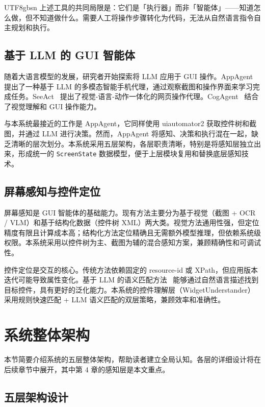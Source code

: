 \documentclass{article}
\begin{document}
\begin{CJK}{UTF8}{gbsn}
上述工具的共同局限是：它们是「执行器」而非「智能体」——知道怎么做，但不知道做什么。需要人工将操作步骤转化为代码，无法从自然语言指令自主规划和执行。

\subsection{基于 LLM 的 GUI 智能体}

随着大语言模型的发展，研究者开始探索将 LLM 应用于 GUI 操作。AppAgent~\cite{appagent} 提出了一种基于 LLM 的多模态智能手机代理，通过观察截图和操作界面来学习完成任务。SeeAct~\cite{seeact} 提出了视觉-语言-动作一体化的网页操作代理。CogAgent~\cite{cogagent} 结合了视觉理解和 GUI 操作能力。

与本系统最接近的工作是 AppAgent，它同样使用 uiautomator2 获取控件树和截图，并通过 LLM 进行决策。然而，AppAgent 将感知、决策和执行混在一起，缺乏清晰的层次划分。本系统采用五层架构，各层职责清晰，特别是将感知层独立出来，形成统一的 \texttt{ScreenState} 数据模型，便于上层模块复用和替换底层感知技术。

\subsection{屏幕感知与控件定位}

屏幕感知是 GUI 智能体的基础能力。现有方法主要分为基于视觉（截图 + OCR / VLM）和基于结构化数据（控件树 XML）两大类。视觉方法通用性强，但定位精度有限且计算成本高；结构化方法定位精确且无需额外模型推理，但依赖系统级权限。本系统采用以控件树为主、截图为辅的混合感知方案，兼顾精确性和可调试性。

控件定位是交互的核心。传统方法依赖固定的 resource-id 或 XPath，但应用版本迭代可能导致属性变化。基于 LLM 的语义匹配方法~\cite{llm_gui} 能够通过自然语言描述找到目标控件，具有更好的泛化能力。本系统的控件理解层（WidgetUnderstander）采用规则快速匹配 + LLM 语义匹配的双层策略，兼顾效率和准确性。

\section{系统整体架构}
\label{sec:system_overview}

本节简要介绍系统的五层整体架构，帮助读者建立全局认知。各层的详细设计将在后续章节中展开，其中第 4 章的感知层是本文重点。

\subsection{五层架构设计}


\end{CJK}
\end{document}
